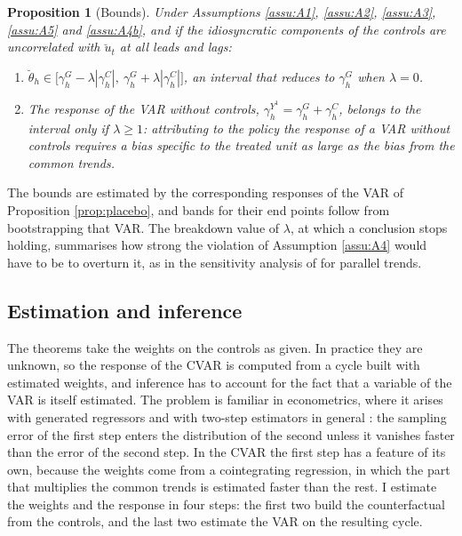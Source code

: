 \documentclass[12pt,a4paper]{article}
\newtheorem{prop}{Proposition}
\theoremstyle{definition}
\theoremstyle{definition}\newtheorem{example}{Example}
\theoremstyle{definition}\newtheorem{definition}{Definition}
\begin{document}
\begin{prop}[Bounds\label{prop:bounds}]
Under Assumptions \ref{assu:A1}, \ref{assu:A2}, \ref{assu:A3}, \ref{assu:A5} and \ref{assu:A4b}, and if the idiosyncratic components of the controls are uncorrelated with $\breve u_t$ at all leads and lags:
\begin{enumerate}
\item[(a)] $\breve\theta_h\in\big[\gamma^G_h-\lambda|\gamma^C_h|,\ \gamma^G_h+\lambda|\gamma^C_h|\big]$, an interval that reduces to $\gamma^G_h$ when $\lambda=0$.
\item[(b)] The response of the VAR without controls, $\gamma^{Y^1}_h=\gamma^G_h+\gamma^C_h$, belongs to the interval only if $\lambda\geq1$: attributing to the policy the response of a VAR without controls requires a bias specific to the treated unit as large as the bias from the common trends.
\end{enumerate}
\end{prop}

The bounds are estimated by the corresponding responses of the VAR of Proposition \ref{prop:placebo}, and bands for their end points follow from bootstrapping that VAR. The breakdown value of $\lambda$, at which a conclusion stops holding, summarises how strong the violation of Assumption \ref{assu:A4} would have to be to overturn it, as in the sensitivity analysis of \citet{RambachanRoth2023} for parallel trends.

\subsection{Estimation and inference\label{sec:estimation}}

The theorems take the weights on the controls as given. In practice they are unknown, so the response of the CVAR is computed from a cycle built with estimated weights, and inference has to account for the fact that a variable of the VAR is itself estimated. The problem is familiar in econometrics, where it arises with generated regressors \citep{Pagan1984} and with two-step estimators in general \citep{MurphyTopel1985,NeweyMcFadden1994}: the sampling error of the first step enters the distribution of the second unless it vanishes faster than the error of the second step. In the CVAR the first step has a feature of its own, because the weights come from a cointegrating regression, in which the part that multiplies the common trends is estimated faster than the rest. I estimate the weights and the response in four steps: the first two build the counterfactual from the controls, and the last two estimate the VAR on the resulting cycle.
\end{document}
